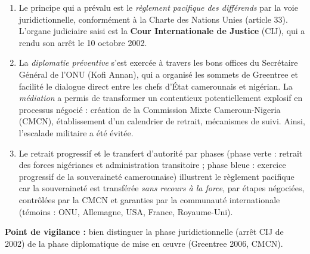 \documentclass[11pt]{article}
\begin{document}
\begin{corrige}
\begin{enumerate}
    \item Le principe qui a prévalu est le \emph{règlement pacifique des différends} par la voie juridictionnelle, conformément à la Charte des Nations Unies (article 33). L'organe judiciaire saisi est la \textbf{Cour Internationale de Justice} (CIJ), qui a rendu son arrêt le 10 octobre 2002.
    \item La \emph{diplomatie préventive} s'est exercée à travers les bons offices du Secrétaire Général de l'ONU (Kofi Annan), qui a organisé les sommets de Greentree et facilité le dialogue direct entre les chefs d'État camerounais et nigérian. La \emph{médiation} a permis de transformer un contentieux potentiellement explosif en processus négocié : création de la Commission Mixte Cameroun-Nigeria (CMCN), établissement d'un calendrier de retrait, mécanismes de suivi. Ainsi, l'escalade militaire a été évitée.
    \item Le retrait progressif et le transfert d'autorité par phases (phase verte : retrait des forces nigérianes et administration transitoire ; phase bleue : exercice progressif de la souveraineté camerounaise) illustrent le règlement pacifique car la souveraineté est transférée \emph{sans recours à la force}, par étapes négociées, contrôlées par la CMCN et garanties par la communauté internationale (témoins : ONU, Allemagne, USA, France, Royaume-Uni).
\end{enumerate}
\textbf{Point de vigilance :} bien distinguer la phase juridictionnelle (arrêt CIJ de 2002) de la phase diplomatique de mise en œuvre (Greentree 2006, CMCN).
\end{corrige}
\end{document}
